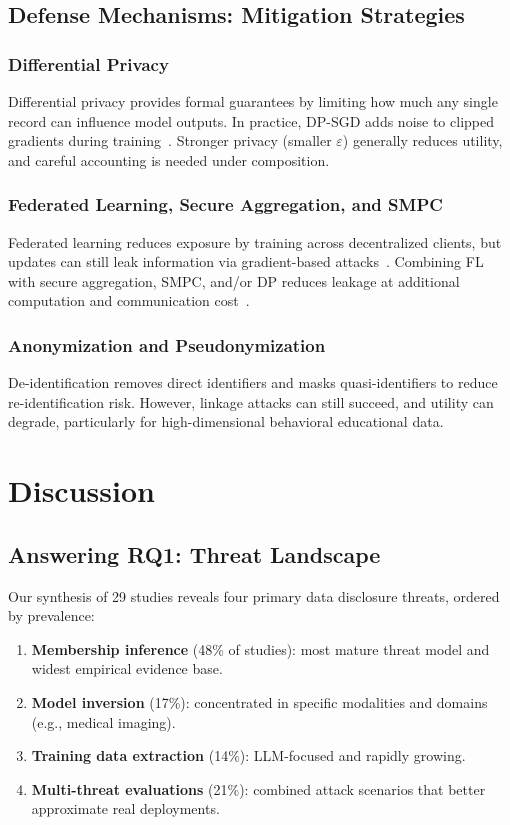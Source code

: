 \documentclass[conference]{IEEEtran}
\begin{document}
\subsection{Defense Mechanisms: Mitigation Strategies}

\subsubsection{Differential Privacy}
Differential privacy provides formal guarantees by limiting how much any single record can influence model outputs. In practice, DP-SGD adds noise to clipped gradients during training~\cite{abadi2016deep}. Stronger privacy (smaller $\varepsilon$) generally reduces utility, and careful accounting is needed under composition.

\subsubsection{Federated Learning, Secure Aggregation, and SMPC}
Federated learning reduces exposure by training across decentralized clients, but updates can still leak information via gradient-based attacks~\cite{geiping2020inverting}. Combining FL with secure aggregation, SMPC, and/or DP reduces leakage at additional computation and communication cost~\cite{xiao2023secure,wang2023federated}.

\subsubsection{Anonymization and Pseudonymization}
De-identification removes direct identifiers and masks quasi-identifiers to reduce re-identification risk. However, linkage attacks can still succeed, and utility can degrade, particularly for high-dimensional behavioral educational data.

\FloatBarrier
\section{Discussion}

\subsection{Answering RQ1: Threat Landscape}
Our synthesis of 29 studies reveals four primary data disclosure threats, ordered by prevalence:
\begin{enumerate}
  \item \textbf{Membership inference} (48\% of studies): most mature threat model and widest empirical evidence base.
  \item \textbf{Model inversion} (17\%): concentrated in specific modalities and domains (e.g., medical imaging).
  \item \textbf{Training data extraction} (14\%): LLM-focused and rapidly growing.
  \item \textbf{Multi-threat evaluations} (21\%): combined attack scenarios that better approximate real deployments.
\end{enumerate}
\end{document}
